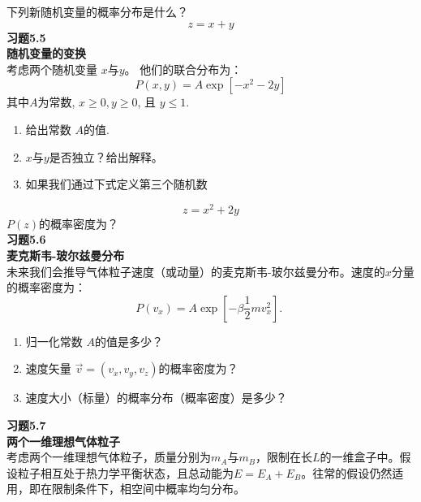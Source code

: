 \documentclass[UTF8]{ctexart}
\numberwithin{equation}{section}%
\numberwithin{figure}{section}%
\begin{document}
    下列新随机变量的概率分布是什么？
    $$
    z=x+y
    $$
    \textbf{习题5.5}\label{prob5.5}\\
    \textbf{随机变量的变换}\\
    考虑两个随机变量 $x$与$y$。 他们的联合分布为：
    $$
    P(x, y)=A \exp \left[-x^{2}-2 y\right]
    $$
    其中$A$为常数, $x \geq 0, y \geq 0$, 且 $y \leq 1$. 
    \begin{enumerate}
    \item 给出常数 $A$的值.
    \item $x$与$y$是否独立？给出解释。
    \item 如果我们通过下式定义第三个随机数
    \end{enumerate}
    $$
    z=x^{2}+2 y
    $$
    $P(z)$的概率密度为？\\
    \textbf{习题5.6}\label{prob5.6}\\
    \textbf{麦克斯韦-玻尔兹曼分布}\\
    未来我们会推导气体粒子速度（或动量）的麦克斯韦-玻尔兹曼分布。速度的$x$分量的概率密度为：
    $$
    P\left(v_{x}\right)=A \exp \left[-\beta \frac{1}{2} m v_{x}^{2}\right] \text {. }
    $$
    \begin{enumerate}
      \item 归一化常数 $A$的值是多少？
    
      \item 速度矢量 $\vec{v}=\left(v_{x}, v_{y}, v_{z}\right)$的概率密度为？
    
      \item 速度大小（标量）的概率分布（概率密度）是多少？
    
    \end{enumerate}
    \textbf{习题5.7}\label{prob5.7}\\
    \textbf{两个一维理想气体粒子}\\
   
    考虑两个一维理想气体粒子，质量分别为$m_{A}$与$m_{B}$，限制在长$L$的一维盒子中。假设粒子相互处于热力学平衡状态，且总动能为$E=E_{A}+E_{B}$。往常的假设仍然适用，即在限制条件下，相空间中概率均匀分布。
    
\end{document}
